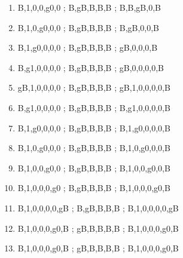 \documentclass[leqno]{article}
\begin{document}
\begin{enumerate}
                    \item {}        {B,1,0,0,g0,0 ; B,gB,B,B,B ; B,B,gB,0,B}
                    \item {}       {B,1,0,g0,0,0 ; B,gB,B,B,B ; B,gB,0,0,B}
                    \item {}      {B,1,g0,0,0,0 ; B,gB,B,B,B ; gB,0,0,0,B}
                    \item {}     {B,g1,0,0,0,0 ; B,gB,B,B,B ; gB,0,0,0,0,B}
                    \item {}   {gB,1,0,0,0,0 ; B,gB,B,B,B ; gB,1,0,0,0,0,B}
                    \item {}     {B,g1,0,0,0,0 ; B,gB,B,B,B ; B,g1,0,0,0,0,B}
                    \item {}     {B,1,g0,0,0,0 ; B,gB,B,B,B ; B,1,g0,0,0,0,B}
                    \item {}     {B,1,0,g0,0,0 ; B,gB,B,B,B ; B,1,0,g0,0,0,B}
                    \item {}     {B,1,0,0,g0,0 ; B,gB,B,B,B ; B,1,0,0,g0,0,B}
                    \item {}     {B,1,0,0,0,g0 ; B,gB,B,B,B ; B,1,0,0,0,g0,B}
                    \item {}   {B,1,0,0,0,0,gB ; B,gB,B,B,B ; B,1,0,0,0,0,gB}
                    \item {}     {B,1,0,0,0,g0,B ; gB,B,B,B,B ; B,1,0,0,0,g0,B}
                    \item {}     {B,1,0,0,0,g0,B ; gB,B,B,B,B ; B,1,0,0,0,g0,B}
                \end{enumerate}
\end{document}
